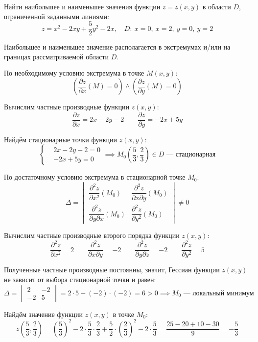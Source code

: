 \begin{problem}
Найти наибольшее и наименьшее значения функции \( z = z(x, y) \) в области \( D \), ограниченной заданными линиями:
\[ z = x^{2} - 2xy + \frac{5}{2}y^2 - 2x, \quad D:\ x=0,\ x=2,\ y=0,\ y=2 \]
\end{problem}

\begin{solution}
  Наибольшее и наименьшее значение располагается в экстремумах и/или на границах рассматриваемой области \( D \).

  По необходимому условию экстремума в точке \( M(x,y) \):
  \[ \left(\dfrac{\partial z}{\partial x}(M)=0\right)\land\left(\dfrac{\partial z}{\partial y}(M)=0\right) \]
  
  Вычислим частные производные функции \( z(x,y) \):
  \[ \dfrac{\partial z}{\partial x}=2x-2y-2\qquad\dfrac{\partial z}{\partial y}=-2x+5y \]
  
  Найдём стационарные точки функции \( z(x,y) \):
  \[
  \begin{cases*}
    &2x-2y-2=0\\
    &-2x+5y=0
  \end{cases*}\implies
  M_0\left(\frac{5}{3},\frac{2}{3}\right)\in D\text{ --- стационарная}
  \]
  
  По достаточному условию экстремума в стационарной точке \( M_0 \):
  \[ \Delta=
  \begin{vmatrix}
    \dfrac{\partial^2 z}{\partial x^2}(M_0) & \dfrac{\partial^2 z}{\partial x\partial y}(M_0) \\[2ex]
    \dfrac{\partial^2 z}{\partial y\partial x}(M_0) & \dfrac{\partial^2 z}{\partial y^2}(M_0)
  \end{vmatrix}\neq 0
  \]
  
  Вычислим частные производные второго порядка функции \( z(x,y) \):
  \[ \dfrac{\partial^2 z}{\partial x^2}=2\qquad\dfrac{\partial^2 z}{\partial x\partial y}=-2\qquad\dfrac{\partial^2 z}{\partial y\partial z}=-2\qquad\dfrac{\partial^2 z}{\partial y^2}=5 \]
  
  Полученные частные производные постоянны, значит, Гессиан функции \( z(x,y) \) не зависит от выбора стационарной точки и равен:
  \[ \Delta=
  \begin{vmatrix}
    2 & -2\\
    -2 & 5
  \end{vmatrix}=2\cdot 5-(-2)\cdot(-2)=6>0\implies M_0\text{ --- локальный минимум}
  \]
  
  Найдём значение функции \( z(x,y) \) в точке \( M_0 \):
  \[ z\left(\dfrac{5}{3},\dfrac{2}{3}\right)=\left(\dfrac{5}{3}\right)^2-2\cdot\dfrac{5}{3}\cdot\dfrac{2}{3}+\dfrac{5}{2}\cdot\left(\dfrac{2}{3}\right)^2-2\cdot\dfrac{5}{3}=\dfrac{25-20+10-30}{9}=-\dfrac{5}{3} \]
  

\end{solution}
